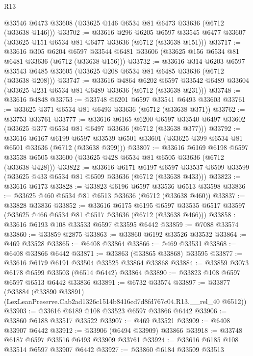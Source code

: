 \begin{lexlean}{R13}
\begin{coremodule}
    @33546
    @6473
    @33608
    (@33625 @146 @6534 @81 @6473 @33636 (@6712 (@33638 @146)))
@33702 := @33616
    @296
    @6205
    @6597
    @33545
    @6477
    @33607
    (@33625 @151 @6534 @81 @6477 @33636 (@6712 (@33638 @151)))
@33717 := @33616
    @305
    @6204
    @6597
    @33544
    @6481
    @33606
    (@33625 @156 @6534 @81 @6481 @33636 (@6712 (@33638 @156)))
@33732 := @33616
    @314
    @6203
    @6597
    @33543
    @6485
    @33605
    (@33625 @208 @6534 @81 @6485 @33636 (@6712 (@33638 @208)))
@33747 := @33616
    @4864
    @6202
    @6597
    @33542
    @6489
    @33604
    (@33625 @231 @6534 @81 @6489 @33636 (@6712 (@33638 @231)))
@33748 := @33616 @4848
@33753 := @33748 @6201 @6597 @33541 @6493 @33603
@33761 := @33625 @371 @6534 @81 @6493 @33636 (@6712 (@33638 @371))
@33762 := @33753 @33761
@33777 := @33616
    @6165
    @6200
    @6597
    @33540
    @6497
    @33602
    (@33625 @377 @6534 @81 @6497 @33636 (@6712 (@33638 @377)))
@33792 := @33616
    @6167
    @6199
    @6597
    @33539
    @6501
    @33601
    (@33625 @399 @6534 @81 @6501 @33636 (@6712 (@33638 @399)))
@33807 := @33616
    @6169
    @6198
    @6597
    @33538
    @6505
    @33600
    (@33625 @428 @6534 @81 @6505 @33636 (@6712 (@33638 @428)))
@33822 := @33616
    @6171
    @6197
    @6597
    @33537
    @6509
    @33599
    (@33625 @433 @6534 @81 @6509 @33636 (@6712 (@33638 @433)))
@33823 := @33616 @6173
@33828 := @33823 @6196 @6597 @33536 @6513 @33598
@33836 := @33625 @460 @6534 @81 @6513 @33636 (@6712 (@33638 @460))
@33837 := @33828 @33836
@33852 := @33616
    @6175
    @6195
    @6597
    @33535
    @6517
    @33597
    (@33625 @466 @6534 @81 @6517 @33636 (@6712 (@33638 @466)))
@33858 := @33616 @6193 @108 @33533 @6597 @33595 @6442
@33859 := @7088 @33574
@33860 := @33859 @2875
@33863 := @33860 @6192 @33526 @33532
@33864 := @469 @33528
@33865 := @6408 @33864
@33866 := @469 @33531
@33868 := @6408 @33866 @6442
@33871 := @33863 (@33865 @33868) @33595
@33877 := @33616 @6179 @6191 @33504 @33525 @33864 @33868
@33884 := @33859 @3073 @6178 @6599 @33503 (@6514 @6442) @33864
@33890 := @33823 @108 @6597 @6597 @6513 @6442 @33836
@33891 := @6732 @33574
@33897 := @33877
    (@33884 (@33890 @33891) (LexLeanPreserve.Cab2ad1326c1514b8416cd7d8fd767c04.R13.__rel_40 @6512))
@33903 := @33616 @6189 @108 @33523 @6597 @33866 @6442
@33906 := @33860 @6188 @33517 @33522
@33907 := @469 @33521
@33909 := @6408 @33907 @6442
@33912 := @33906 (@6494 @33909) @33866
@33918 := @33748 @6187 @6597 @33516 @6493 @33909 @33761
@33924 := @33616 @6185 @108 @33514 @6597 @33907 @6442
@33927 := @33860 @6184 @33509 @33513

\end{coremodule}
\end{lexlean}
